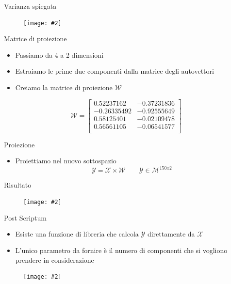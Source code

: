 \documentclass[xcolor={dvipsnames}]{beamer}
\newcommand{\codice}[2]{}
\newcommand{\figcen}[2]{
	\begin{figure}
		\begin{center}
			\texttt{[image: \#2]}
		\end{center}
	\end{figure}
}
\begin{document}
		\begin{frame}{Varianza spiegata}
			\figcen{.75\textwidth}{istoVarianza}
		\end{frame}
	
		\begin{frame}{Matrice di proiezione}
			\begin{itemize}
				\item Passiamo da 4 a 2 dimensioni
				\item Estraiamo le prime due componenti dalla matrice degli autovettori
			\end{itemize}
			\codice{125}{127}
			\begin{itemize}
				\item Creiamo la matrice di proiezione $\mathcal{W}$
			\end{itemize}
			$$\mathcal{W} = \begin{bmatrix}
			0.52237162 & -0.37231836\\
			-0.26335492 & -0.92555649\\
			0.58125401 & -0.02109478\\
			0.56561105 & -0.06541577\\
			\end{bmatrix}$$
		\end{frame}

		\begin{frame}{Proiezione}
			\begin{itemize}
				\item Proiettiamo nel nuovo sottospazio $$\mathcal{Y} = \mathcal{X}\times \mathcal{W} \qquad \mathcal{Y} \in \mathcal{M}^{150x2}$$
			\end{itemize}
			\codice{132}{133}
		\end{frame}
		
		\begin{frame}{Risultato}
			\figcen{.8\textwidth}{PCA}
		\end{frame}
		
		\begin{frame}{Post Scriptum}
			\begin{itemize}
				\item Esiste una funzione di libreria che calcola $\mathcal{Y}$ direttamente da $\mathcal{X}$
				\item L'unico parametro da fornire è il numero di componenti che si vogliono prendere in considerazione
			\end{itemize}
			\codice{149}{151}
			\figcen{.3\textwidth}{ok}
		\end{frame}
\end{document}
